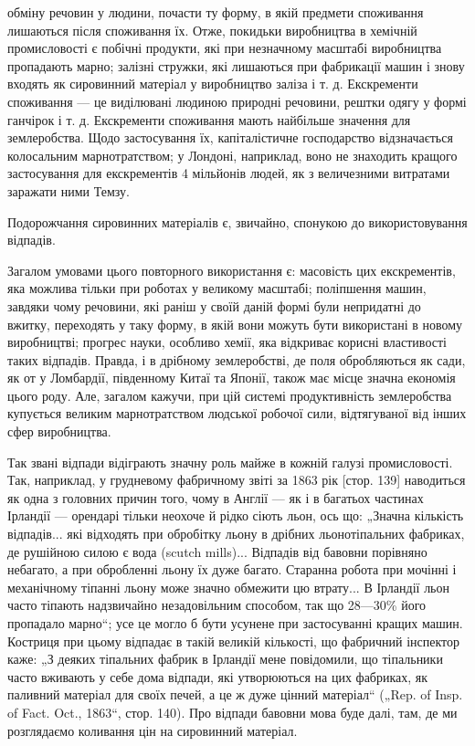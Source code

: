 \parcont{}  %
обміну речовин у людини, почасти ту форму, в якій предмети
споживання лишаються після споживання їх. Отже, покидьки
виробництва в хемічній промисловості є побічні продукти, які
при незначному масштабі виробництва пропадають марно; залізні
стружки, які лишаються при фабрикації машин і знову входять
як сировинний матеріал у виробництво заліза і т. д. Екскременти споживання — це виділювані людиною
природні речовини,
рештки одягу у формі ганчірок і т. д. Екскременти споживання
мають найбільше значення для землеробства. Щодо застосування
їх, капіталістичне господарство відзначається колосальним марнотратством; у Лондоні, наприклад, воно
не знаходить кращого
застосування для екскрементів 4 мільйонів людей, як з величезними витратами заражати ними Темзу.

Подорожчання сировинних матеріалів є, звичайно, спонукою
до використовування відпадів.

Загалом умовами цього повторного використання є: масовість
цих екскрементів, яка можлива тільки при роботах у великому
масштабі; поліпшення машин, завдяки чому речовини, які раніш
у своїй даній формі були непридатні до вжитку, переходять
у таку форму, в якій вони можуть бути використані в новому
виробництві; прогрес науки, особливо хемії, яка відкриває корисні властивості таких відпадів.
Правда, і в дрібному землеробстві, де поля обробляються як сади, як от у Ломбардії, південному Китаї
та Японії, також має місце значна економія
цього роду. Але, загалом кажучи, при цій системі продуктивність землеробства купується великим
марнотратством людської робочої сили, відтягуваної від інших сфер виробництва.

Так звані відпади відіграють значну роль майже в кожній
галузі промисловості. Так, наприклад, у грудневому фабричному звіті за 1863 рік [стор. 139]
наводиться як одна з головних
причин того, чому в Англії — як і в багатьох частинах Ірландії —
орендарі тільки неохоче й рідко сіють льон, ось що: „Значна
кількість відпадів... які відходять при обробітку льону в дрібних льонотіпальних фабриках, де
рушійною силою є вода
(scutch mills)... Відпадів від бавовни порівняно небагато, а при
обробленні льону їх дуже багато. Старанна робота при мочінні і механічному тіпанні льону може значно
обмежити цю
втрату... В Ірландії льон часто тіпають надзвичайно незадовільним способом, так що 28—30\% його
пропадало марно“; усе це
могло б бути усунене при застосуванні кращих машин. Костриця при цьому відпадає в такій великій
кількості, що фабричний інспектор каже: „З деяких тіпальних фабрик в Ірландії
мене повідомили, що тіпальники часто вживають у себе дома
відпади, які утворюються на цих фабриках, як паливний матеріал для своїх печей, а це ж дуже цінний
матеріал“ („Rep. of
Insp. of Fact. Oct., 1863“, стор. 140). Про відпади бавовни мова
буде далі, там, де ми розглядаємо коливання цін на сировинний
матеріал.
